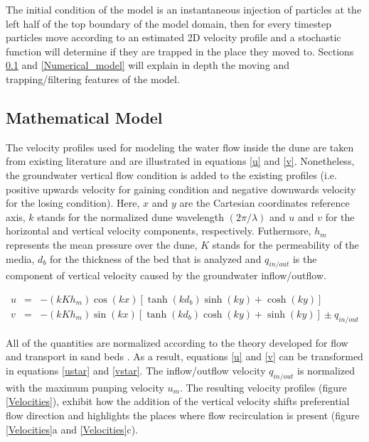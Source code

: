 \documentclass[draft,linenumbers]{agujournal2018}
\begin{document}
The initial condition of the model is an instantaneous injection of particles at the left half of the top boundary of the model domain, then for every timestep particles move according to an estimated 2D velocity profile and a stochastic function will determine if they are trapped in the place they moved to. Sections \ref{Mathematical_model} and \ref{Numerical_model} will explain in depth the moving and trapping/filtering features of the model. 

\subsection{Mathematical Model} \label{Mathematical_model}

The velocity profiles used for modeling the water flow inside the dune are taken from existing literature \citep{Elliott1997,Packman2000} and are illustrated in equations \ref{u} and \ref{v}. Nonetheless, the groundwater vertical flow condition is added to the existing profiles (i.e. positive upwards velocity for gaining condition and negative downwards velocity for the losing condition). Here, $x$ and $y$ are the Cartesian coordinates reference axis, $k$ stands for the normalized dune wavelength $(2 \pi / \lambda)$ and $u$ and $v$ for the horizontal and vertical velocity components, respectively. Futhermore, $h_m$ represents the mean pressure over the dune, $K$ stands for the permeability of the media, $d_b$ for the thickness of the bed that is analyzed and $q_{in/out}$ is the component of vertical velocity caused by the groundwater inflow/outflow. 

\begin{eqnarray}
\label{u}
  u & = & -(kKh_{m}) \cos(kx) [\tanh(kd_b)\sinh(ky) + \cosh(ky)] \\
\label{v}
  v & = & -(kKh_{m}) \sin(kx) [\tanh(kd_b)\cosh(ky) + \sinh(ky)] \pm q_{in/out} 
\end{eqnarray}

All of the quantities are normalized according to the theory developed for flow and transport in sand beds \citep{Elliott1997,Packman2000}. As a result, equations \ref{u} and \ref{v} can be transformed in equations \ref{ustar} and \ref{vstar}. The inflow/outflow velocity $q_{in/out}$ is normalized with the maximum punping velocity $u_m$. The resulting velocity profiles (figure \ref{Velocities}), exhibit how the addition of the vertical velocity shifts preferential flow direction and highlights the places where flow recirculation is present (figure \ref{Velocities}a and \ref{Velocities}c).  
\end{document}
